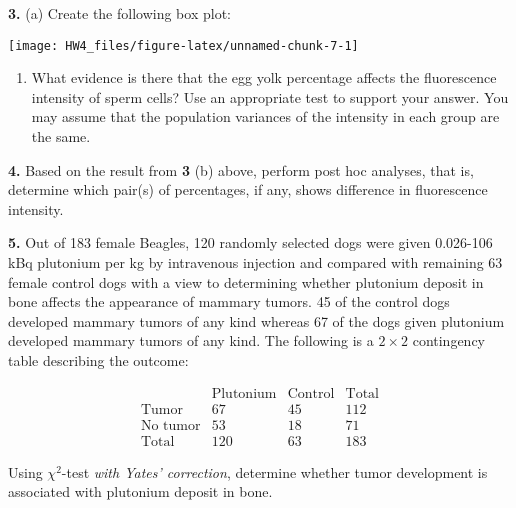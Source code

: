 \documentclass[]{article}
\providecommand{\tightlist}{%
  \setlength{\itemsep}{0pt}\setlength{\parskip}{0pt}}
\begin{document}
\textbf{3.} (a) Create the following box plot:

\begin{center}\texttt{[image: HW4\_files/figure-latex/unnamed-chunk-7-1]} \end{center}

\begin{enumerate}
\def\labelenumi{(\alph{enumi})}
\setcounter{enumi}{1}
\tightlist
\item
  What evidence is there that the egg yolk percentage affects the
  fluorescence intensity of sperm cells? Use an appropriate test to
  support your answer. You may assume that the population variances of
  the intensity in each group are the same.
\end{enumerate}

\textbf{4.} Based on the result from \textbf{3} (b) above, perform post
hoc analyses, that is, determine which pair(s) of percentages, if any,
shows difference in fluorescence intensity.

\textbf{5.} Out of 183 female Beagles, 120 randomly selected dogs were
given 0.026-106 kBq plutonium per kg by intravenous injection and
compared with remaining 63 female control dogs with a view to
determining whether plutonium deposit in bone affects the appearance of
mammary tumors. 45 of the control dogs developed mammary tumors of any
kind whereas 67 of the dogs given plutonium developed mammary tumors of
any kind. The following is a \(2\times 2\) contingency table describing
the outcome:

\[\begin{array}{c|ccc} & \text{Plutonium} & \text{Control} & \text{Total} \\ \hline   
\text{Tumor} & 67 & 45 & 112 \\  
\text{No tumor} & 53 & 18 & 71 \\
\text{Total} & 120 & 63 & 183
\end{array}\]

Using \(\chi^2\)-test \emph{with Yates' correction}, determine whether
tumor development is associated with plutonium deposit in bone.
\end{document}
